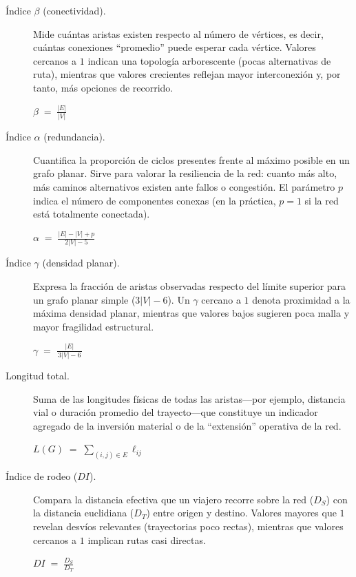     \begin{description}

    \item[Índice $\beta$ (conectividad).]
    Mide cuántas aristas existen respecto al número de vértices, es decir, cuántas conexiones “promedio” puede esperar cada vértice. Valores cercanos a $1$ indican una topología arborescente (pocas alternativas de ruta), mientras que valores crecientes reflejan mayor interconexión y, por tanto, más opciones de recorrido.
    \begin{center}
    $\displaystyle \beta \;=\; \frac{|E|}{|V|}$
    \end{center}

    \item[Índice $\alpha$ (redundancia).]
    Cuantifica la proporción de ciclos presentes frente al máximo posible en un grafo planar. Sirve para valorar la resiliencia de la red: cuanto más alto, más caminos alternativos existen ante fallos o congestión. El parámetro $p$ indica el número de componentes conexas (en la práctica, $p=1$ si la red está totalmente conectada).
    \begin{center}
    $\displaystyle \alpha \;=\; \frac{|E| - |V| + p}{\,2|V| - 5\,}$
    \end{center}

    \item[Índice $\gamma$ (densidad planar).]
    Expresa la fracción de aristas observadas respecto del límite superior para un grafo planar simple ($3|V|-6$). Un $\gamma$ cercano a $1$ denota proximidad a la máxima densidad planar, mientras que valores bajos sugieren poca malla y mayor fragilidad estructural.
    \begin{center}
    $\displaystyle \gamma \;=\; \frac{|E|}{\,3|V| - 6\,}$
    \end{center}

    \item[Longitud total.]
    Suma de las longitudes físicas de todas las aristas—por ejemplo, distancia vial o duración promedio del trayecto—que constituye un indicador agregado de la inversión material o de la “extensión” operativa de la red.
    \begin{center}
    $\displaystyle L(G) \;=\; \sum_{(i,j)\in E} \ell_{ij}$
    \end{center}

    \item[Índice de rodeo ($DI$).]
    Compara la distancia efectiva que un viajero recorre sobre la red ($D_S$) con la distancia euclidiana ($D_T$) entre origen y destino. Valores mayores que $1$ revelan desvíos relevantes (trayectorias poco rectas), mientras que valores cercanos a $1$ implican rutas casi directas.
    \begin{center}
    $\displaystyle DI \;=\; \frac{D_S}{D_T}$
    \end{center}


\end{description}
